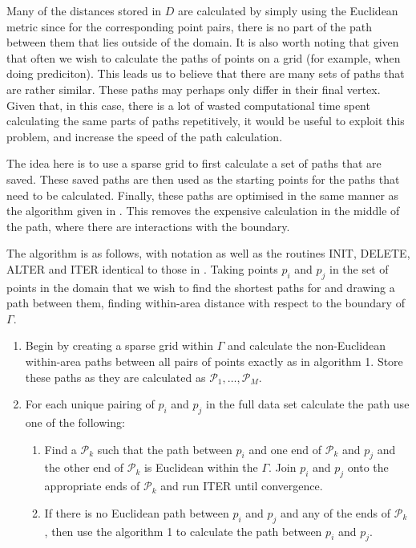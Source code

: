 Many of the distances stored in $D$ are calculated by simply using the Euclidean metric since for the corresponding point pairs, there is no part of the path between them that lies outside of the domain. It is also worth noting that given that often we wish to calculate the paths of points on a grid (for example, when doing prediciton). This leads us to believe that there are many sets of paths that are rather similar. These paths may perhaps only differ in their final vertex. Given that, in this case, there is a lot of wasted computational time spent calculating the same parts of paths repetitively, it would be useful to exploit this problem, and increase the speed of the path calculation.

The idea here is to use a sparse grid to first calculate a set of paths that are saved. These saved paths are then used as the starting points for the paths that need to be calculated. Finally, these paths are optimised in the same manner as the algorithm given in . This removes the expensive calculation in the middle of the path, where there are interactions with the boundary.

The algorithm is as follows, with notation as well as the routines INIT, DELETE, ALTER and ITER identical to those in . Taking points $p_i$ and $p_j$ in the set of points in the domain that we wish to find the shortest paths for and drawing a path between them, finding within-area distance with respect to the boundary of $\Gamma$.

\begin{enumerate}
 \item Begin by creating a sparse grid within $\Gamma$ and calculate the non-Euclidean within-area paths between all pairs of points exactly as in algorithm 1. Store these paths as they are calculated as $\mathcal{P}_1,\ldots, \mathcal{P}_M$.
\item For each unique pairing of $p_i$ and $p_j$ in the full data set calculate the path use one of the following:
	\begin{enumerate}
	\item Find a $\mathcal{P}_k$ such that the path between $p_i$ and one end of $\mathcal{P}_k$ and $p_j$ and the other end of $\mathcal{P}_k$ is Euclidean within the $\Gamma$. Join $p_i$ and $p_j$ onto the appropriate ends of $\mathcal{P}_k$ and run ITER until convergence.
	\item If there is no Euclidean path between $p_i$ and $p_j$ and any of the ends of $\mathcal{P}_k$, then use the algorithm 1 to calculate the path between $p_i$ and $p_j$. 
	\end{enumerate}
\end{enumerate}

